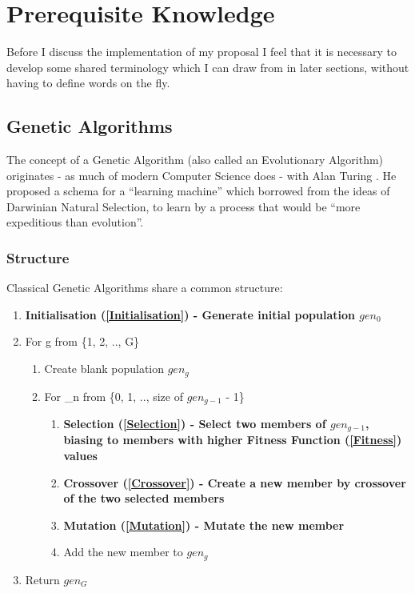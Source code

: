 \section{Prerequisite Knowledge}
Before I discuss the implementation of my proposal I feel that it is necessary to develop some shared terminology which I can draw from in later sections, without having to define words on the fly. 
\subsection{Genetic Algorithms}
The concept of a Genetic Algorithm (also called an Evolutionary Algorithm) originates - as much of modern Computer Science does - with Alan Turing \cite{turingImitation}. He proposed a schema for a ``learning machine'' which borrowed from the ideas of Darwinian Natural Selection, to learn by a process that would be ``more expeditious than evolution''.

\subsubsection{Structure} \label{Structure}
Classical Genetic Algorithms share a common structure:
\begin{enumerate}
    \item \bf Initialisation (\ref{Initialisation}) \rm - Generate initial population $gen_{0}$
    \item For g from \{1, 2, .., G\}
    \begin{enumerate}
        \item Create blank population $gen_{g}$
        \item For \_n from \{0, 1, .., size of $gen_{g-1}$ - 1\}
        \begin{enumerate}
            \item \bf Selection (\ref{Selection}) \rm - Select two members of $gen_{g-1}$, biasing to members with higher \bf Fitness Function (\ref{Fitness}) \rm values
            \item \bf Crossover (\ref{Crossover}) \rm - Create a new member by crossover of the two selected members
            \item \bf Mutation (\ref{Mutation}) \rm - Mutate the new member
            \item Add the new member to $gen_{g}$
        \end{enumerate}
    \end{enumerate}
    \item Return $gen_{G}$
\end{enumerate}

